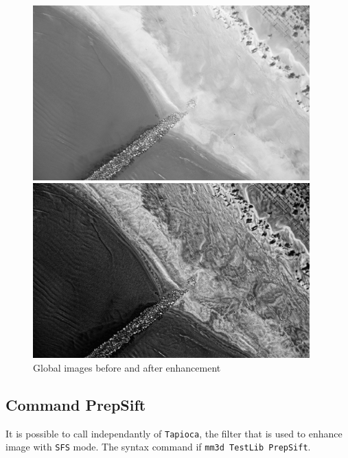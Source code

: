 \begin{figure}
\begin{center}
\includegraphics[width=0.95\textwidth]{FIGS/Tapioca-SFS/Im-STD.jpg}

\includegraphics[width=0.95\textwidth]{FIGS/Tapioca-SFS/Im-SFS.jpg}
\end{center}
\caption{Global images before and after enhancement}
\label{FIG:SF:Img}
\end{figure}


\newpage

\subsection{Command PrepSift}

It is possible to call independantly of {\tt Tapioca}, the filter  that is used
to enhance image with {\tt SFS} mode. The syntax command if {\tt mm3d TestLib PrepSift}.


